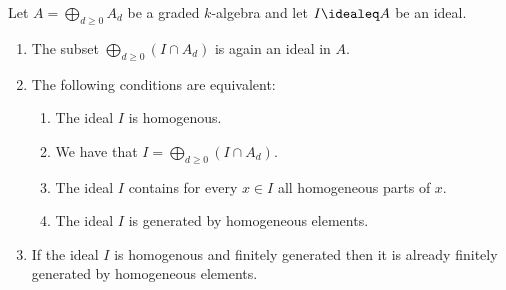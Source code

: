 \begin{lemma}
  \label{lemma: characterization of homogeneous ideals via homogeneous generators}
  Let $A = \bigoplus_{d \geq 0} A_d$ be a graded $k$-algebra and let $I \idealeq A$ be an ideal.
  \begin{enumerate}
    \item
      \label{enumerate: intersection is again a graded ideal}
      The subset $\bigoplus_{d \geq 0} (I \cap A_d)$ is again an ideal in $A$.
    \item
      The following conditions are equivalent:
      \begin{enumerate}
        \item
          \label{enumerate: ideal is homogeneous}
          The ideal $I$ is homogenous.
        \item
          \label{enumerate: ideal has decomposition}
          We have that $I = \bigoplus_{d \geq 0} (I \cap A_d)$.
        \item
          \label{enumerate: ideal contains homogenous parts}
          The ideal $I$ contains for every $x \in I$ all homogeneous parts of $x$.
        \item
          \label{enumerate: ideal is generated by homogeneous}
          The ideal $I$ is generated by homogeneous elements.
      \end{enumerate}
    \item
      If the ideal $I$ is homogenous and finitely generated then it is already finitely generated by homogeneous elements.
  \end{enumerate}
\end{lemma}


